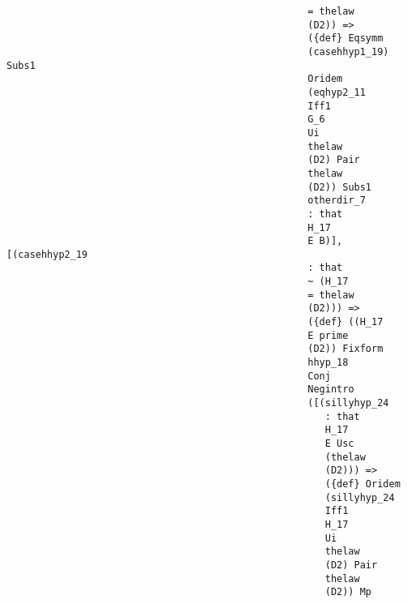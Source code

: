 \documentclass[12pt]{article}
\begin{document}
\begin{verbatim}
                                                    = thelaw 
                                                    (D2)) => 
                                                    ({def} Eqsymm 
                                                    (casehhyp1_19) Subs1 
                                                    Oridem 
                                                    (eqhyp2_11 
                                                    Iff1 
                                                    G_6 
                                                    Ui 
                                                    thelaw 
                                                    (D2) Pair 
                                                    thelaw 
                                                    (D2)) Subs1 
                                                    otherdir_7 
                                                    : that 
                                                    H_17 
                                                    E B)], [(casehhyp2_19 
                                                    : that 
                                                    ~ (H_17 
                                                    = thelaw 
                                                    (D2))) => 
                                                    ({def} ((H_17 
                                                    E prime 
                                                    (D2)) Fixform 
                                                    hhyp_18 
                                                    Conj 
                                                    Negintro 
                                                    ([(sillyhyp_24 
                                                       : that 
                                                       H_17 
                                                       E Usc 
                                                       (thelaw 
                                                       (D2))) => 
                                                       ({def} Oridem 
                                                       (sillyhyp_24 
                                                       Iff1 
                                                       H_17 
                                                       Ui 
                                                       thelaw 
                                                       (D2) Pair 
                                                       thelaw 
                                                       (D2)) Mp 

\end{verbatim}
\end{document}
